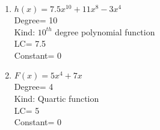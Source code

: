 \begin{enumerate}[label = \Alph*. ]
\begin{enumerate}[label = \arabic*. ]
\item \hspce %
$h(x) =7.5x^{10}+11x^8-3x^4$\\
Degree= 10 \\
Kind: $10^{th}$ degree polynomial function \\
LC= 7.5 \\
Constant= 0

\item \hspce%
$F(x) =5x^4+7x$\\
Degree= 4 \\
Kind: Quartic function \\
LC= 5 \\
Constant= 0

\end{enumerate} 
\end{enumerate}